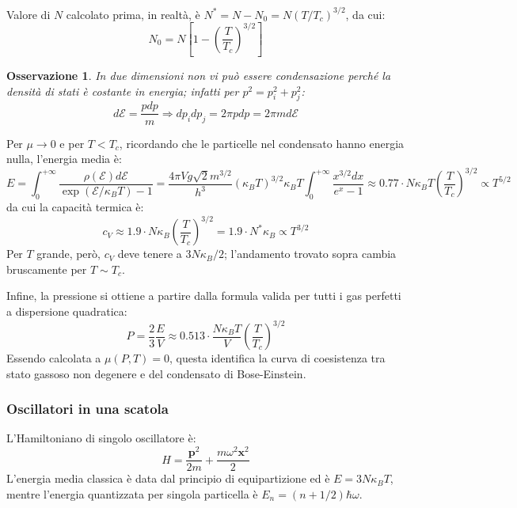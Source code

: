\documentclass[10pt, a4paper]{scrartcl}
\numberwithin{equation}{subsection}
\theoremstyle{style1}
\newtheorem{osservazione}{Osservazione}[section]
\begin{document}
Valore di $N$ calcolato prima, in realt\`a, \`e $N^* = N - N_0 = N (T / T_c)^{3 / 2} $, da cui:
\begin{equation}
	N_0 = N \left[1 - \left(\frac{T}{T_c}\right) ^{3 / 2} \right] 
\end{equation}
\begin{osservazione}
	In due dimensioni non vi pu\`o essere condensazione perch\'e la densit\`a di stati \`e costante in energia; infatti per $p^2=p_i^2+p_j^2$:
	\[
	d \mathscr{E} = \frac{p dp }{m} \Rightarrow dp_i dp_j = 2 \pi p dp = 2\pi m d\mathscr{E}
	\] 
\end{osservazione}
\noindent Per $\mu \to 0$ e per $T< T_c$, ricordando che le particelle nel condensato hanno energia nulla, l'energia media \`e:
\begin{equation}
		E = \int_{0} ^{+\infty}\frac{\rho  ( \mathscr{E}) d \mathscr{E}}{\exp(\mathscr{E} / \kappa _B T) - 1} = \frac{4\pi V g \sqrt{2} m^{3 / 2} }{h^3} (\kappa _BT)^{ 3 / 2} \kappa _B T \int_{0} ^{+\infty} \frac{x ^{3 / 2} dx}{e^x - 1}\approx 0.77 \cdot N\kappa _B T \left(\frac{T}{T_c}\right) ^{3 / 2} \propto T^{5 / 2} 
\end{equation}
da cui la capacit\`a termica \`e:
\begin{equation}
	c_V \approx 1.9 \cdot  N\kappa _B \left(\frac{T}{T_c}\right) ^{3 / 2} = 1.9 \cdot  N^* \kappa _B \propto T^{3 / 2} 
\end{equation}
Per $T$ grande, per\`o, $c_V $ deve tenere a $3N\kappa _B / 2$; l'andamento trovato sopra cambia bruscamente per $T \sim T_c$.

Infine, la pressione si ottiene a partire dalla formula valida per tutti i gas perfetti a dispersione quadratica:
\begin{equation}
	P = \frac{2}{3} \frac{E}{V} \approx 0.513 \cdot  \frac{N\kappa _B T}{V} \left(\frac{T}{T_c}\right) ^{3/2} 
\end{equation}
Essendo calcolata a $\mu (P,T) = 0$, questa identifica la curva di coesistenza tra stato gassoso non degenere e del condensato di Bose-Einstein.

\subsubsection{Oscillatori in una scatola}

L'Hamiltoniano di singolo oscillatore \`e:
\begin{equation}
	H = \frac{\mathbf{p} ^2}{2m} + \frac{m\omega ^2 \mathbf{x} ^2}{2}		
\end{equation}
L'energia media classica \`e data dal principio di equipartizione ed \`e $E = 3N\kappa _B T$, mentre l'energia quantizzata per singola particella \`e $E_n=(n+1 / 2) \hbar \omega$.
\end{document}
